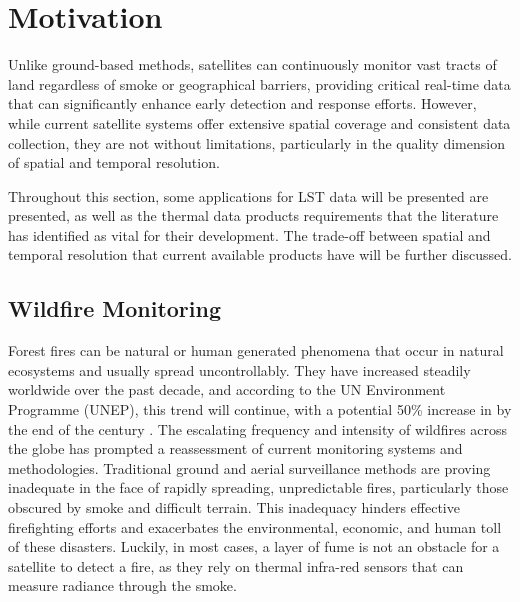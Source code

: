     
    \newpage
    

\section{Motivation}

Unlike ground-based methods, satellites can continuously monitor vast tracts of land regardless of smoke or geographical barriers, providing critical real-time data that can significantly enhance early detection and response efforts. 
However, while current satellite systems offer extensive spatial coverage and consistent data collection, they are not without limitations, particularly in the quality dimension of spatial and temporal resolution.

Throughout this section, some applications for LST data will be presented are presented, as well as the thermal data products requirements that the literature has identified as vital for their development. The trade-off between spatial and temporal resolution that current available products have will be further discussed.
    

    \subsection{Wildfire Monitoring}

    Forest fires can be natural or human generated phenomena that occur in natural ecosystems and usually spread uncontrollably.
    They have increased steadily worldwide over the past decade, and according to the UN Environment Programme (UNEP), this trend will continue, with a potential 50\% increase in by the end of the century \cite{UNEP2021Wildfire}. 
    The escalating frequency and intensity of wildfires across the globe has prompted a reassessment of current monitoring systems and methodologies. Traditional ground and aerial surveillance methods are proving inadequate in the face of rapidly spreading, unpredictable fires, particularly those obscured by smoke and difficult terrain. This inadequacy hinders effective firefighting efforts and exacerbates the environmental, economic, and human toll of these disasters. 
    Luckily, in most cases, a layer of fume is not an obstacle for a satellite to detect a fire, as they rely on thermal infra-red sensors that can measure radiance through the smoke.

